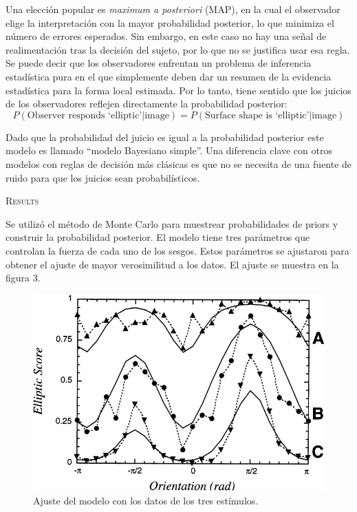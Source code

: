\documentclass[a4paper,12pt]{article}
\begin{document}
Una elección popular es {\itshape maximum a posteriori} (MAP), en la cual el observador elige la interpretación con la mayor probabilidad posterior, lo que minimiza el número de errores esperados. Sin embargo, en este caso no hay una señal de realimentación tras la decisión del sujeto, por lo que no se justifica usar esa regla. Se puede decir que los observadores enfrentan un problema de inferencia estadística pura en el que simplemente deben dar un resumen de la evidencia estadística para la forma local estimada. Por lo tanto, tiene sentido que los juicios de los observadores reflejen directamente la probabilidad posterior:
\begin{equation}
	P(\mbox{Observer responds `elliptic'|image}) = P(\mbox{Surface shape is `elliptic'|image})
\end{equation}

Dado que la probabilidad del juicio es igual a la probabilidad posterior este modelo es llamado ``modelo Bayesiano simple''. Una diferencia clave con otros modelos con reglas de decisión más clásicas es que no se necesita de una fuente de ruido para que los juicios sean probabilísticos.

{\scshape Results}

Se utilizó el método de Monte Carlo para muestrear probabilidades de priors y construir la probabilidad posterior. El modelo tiene tres parámetros que controlan la fuerza de cada uno de los sesgos. Estos parámetros se ajustaron para obtener el ajuste de mayor verosimilitud a los datos. El ajuste se muestra en la figura 3.

\begin{figure}[hb]
\begin{center}
	\includegraphics[scale=0.5]{Mamassian1998(3).png}
	\caption{Ajuste del modelo con los datos de los tres estímulos.}
\end{center}
\end{figure}
\end{document}
